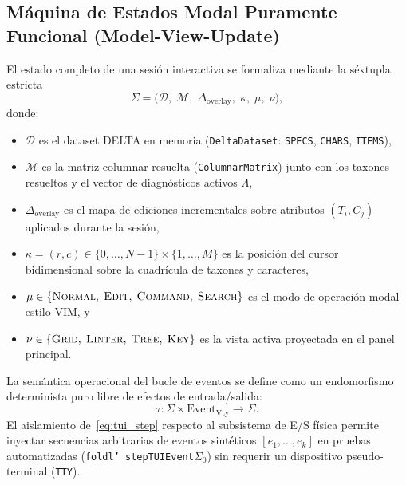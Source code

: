 \documentclass[11pt,a4paper]{article}
\theoremstyle{definition}
\theoremstyle{remark}
\begin{document}
\subsection{Máquina de Estados Modal Puramente Funcional (Model-View-Update)}
El estado completo de una sesión interactiva se formaliza mediante la séxtupla estricta
\begin{equation}
\label{eq:tui_state}
\Sigma = \big(\mathcal{D},\; \mathcal{M},\; \Delta_{\text{overlay}},\; \kappa,\; \mu,\; \nu\big),
\end{equation}
donde:
\begin{itemize}
    \item $\mathcal{D}$ es el dataset DELTA en memoria (\texttt{DeltaDataset}: \texttt{SPECS}, \texttt{CHARS}, \texttt{ITEMS}),
    \item $\mathcal{M}$ es la matriz columnar resuelta (\texttt{ColumnarMatrix}) junto con los taxones resueltos y el vector de diagnósticos activos $\Lambda$,
    \item $\Delta_{\text{overlay}}$ es el mapa de ediciones incrementales sobre atributos $(T_i, C_j)$ aplicados durante la sesión,
    \item $\kappa = (r, c) \in \{0,\dots,N-1\} \times \{1,\dots,M\}$ es la posición del cursor bidimensional sobre la cuadrícula de taxones y caracteres,
    \item $\mu \in \{\textsc{Normal},\; \textsc{Edit},\; \textsc{Command},\; \textsc{Search}\}$ es el modo de operación modal estilo VIM, y
    \item $\nu \in \{\textsc{Grid},\; \textsc{Linter},\; \textsc{Tree},\; \textsc{Key}\}$ es la vista activa proyectada en el panel principal.
\end{itemize}
La semántica operacional del bucle de eventos se define como un endomorfismo determinista puro libre de efectos de entrada/salida:
\begin{equation}
\label{eq:tui_step}
\tau \colon \Sigma \times \mathrm{Event}_{\text{Vty}} \longrightarrow \Sigma.
\end{equation}
El aislamiento de~\eqref{eq:tui_step} respecto al subsistema de E/S física permite inyectar secuencias arbitrarias de eventos sintéticos $[e_1, \dots, e_k]$ en pruebas automatizadas (\texttt{foldl' stepTUIEvent}\;$\Sigma_0$) sin requerir un dispositivo pseudo-terminal (\texttt{TTY}).
\end{document}
